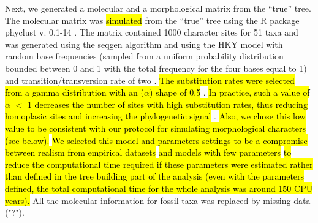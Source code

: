 \documentclass[12pt,letterpaper]{article}
\begin{document}
Next, we generated a molecular and a morphological matrix from the ``true'' tree.
The molecular matrix was \hl{simulated} from the ``true'' tree using the R package phyclust v. 0.1-14 \citep{chen2011}.
The matrix contained 1000 character sites for 51 taxa and was generated using the seqgen algorithm \citep{ranbaut1997seqgen} and using the HKY model \citep{HKY85} with random base frequencies (sampled from a uniform probability distribution bounded between 0 and 1 with the total frequency for the four bases equal to 1) and transition/transversion rate of two \citep{douadycomparison2003}.
\hl{The substitution rates were selected from a gamma distribution with an ($\alpha$) shape of 0.5} \citep{yangamong-site1996}.
\hl{In practice, such a value of $\alpha$ $<$ 1 decreases the number of sites with high substitution rates, thus reducing homoplasic sites and increasing the phylogenetic signal} \citep{Hassanin1998611,EstoupHomoplasy}.
\hl{Also, we chose this low value to be consistent with our protocol for simulating morphological characters (see below).}
\hl{We selected this model and parameters settings to be a compromise between realism from empirical datasets} \citep[e.g.][]{kellymolecular2014} \hl{and models with few parameters} \citep[cf.][]{springermacroevolutionary2012} \hl{to reduce the computational time required if these parameters were estimated rather than defined in the tree building part of the analysis (even with the parameters defined, the total computational time for the whole analysis was around 150 CPU years).}
All the molecular information for fossil taxa was replaced by missing data ("?").
\end{document}
